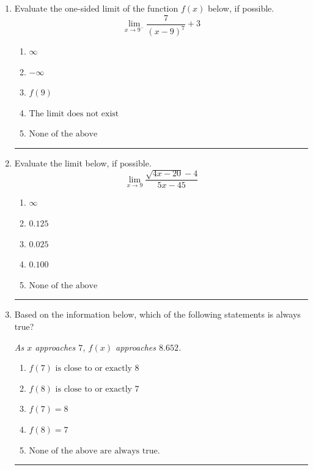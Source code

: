 \documentclass[14pt]{extbook}
\newcommand{\litem}[1]{\item#1\hspace*{-1cm}\rule{\textwidth}{0.4pt}}
\begin{document}
\begin{enumerate}
\litem{
Evaluate the one-sided limit of the function $f(x)$ below, if possible.\[ \lim_{x \rightarrow 9^-} \frac{7}{(x-9)^7}+3 \]\begin{enumerate}[label=\Alph*.]
\item \( \infty \)
\item \( -\infty \)
\item \( f(9) \)
\item \( \text{The limit does not exist} \)
\item \( \text{None of the above} \)

\end{enumerate} }
\litem{
Evaluate the limit below, if possible.\[ \lim_{x \rightarrow 9} \frac{\sqrt{4x - 20} - 4}{5x - 45} \]\begin{enumerate}[label=\Alph*.]
\item \( \infty \)
\item \( 0.125 \)
\item \( 0.025 \)
\item \( 0.100 \)
\item \( \text{None of the above} \)

\end{enumerate} }
\litem{
Based on the information below, which of the following statements is always true?
\begin{center}
    \textit{ As $x$ approaches $7$, $f(x)$ approaches $8.652$. }
\end{center}
\begin{enumerate}[label=\Alph*.]
\item \( f(7) \text{ is close to or exactly } 8 \)
\item \( f(8) \text{ is close to or exactly } 7 \)
\item \( f(7) = 8 \)
\item \( f(8) = 7 \)
\item \( \text{None of the above are always true.} \)


\end{enumerate}}
\end{enumerate}
\end{document}

